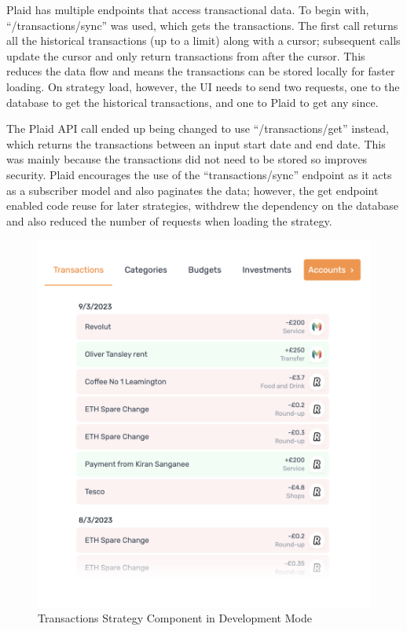 Plaid has multiple endpoints that access transactional data. To begin with, ``/transactions/sync'' was used, which gets the transactions. The first call returns all the historical transactions (up to a limit) along with a cursor; subsequent calls update the cursor and only return transactions from after the cursor. This reduces the data flow and means the transactions can be stored locally for faster loading. On strategy load, however, the UI needs to send two requests, one to the database to get the historical transactions, and one to Plaid to get any since.

The Plaid API call ended up being changed to use ``/transactions/get'' instead, which returns the transactions between an input start date and end date. This was mainly because the transactions did not need to be stored so improves security. Plaid encourages the use of the ``transactions/sync'' endpoint as it acts as a subscriber model and also paginates the data; however, the get endpoint enabled code reuse for later strategies, withdrew the dependency on the database and also reduced the number of requests when loading the strategy.

\begin{figure}[H]
	\centering
	\includegraphics[width=\textwidth]{images/transactions_development.png}
	\caption{Transactions Strategy Component in Development Mode}
	\label{fig:TransactionsStrategy}
\end{figure}

